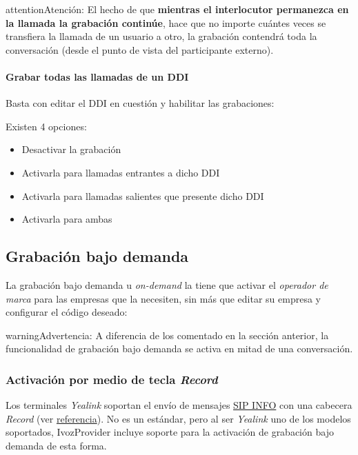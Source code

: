 \documentclass[letterpaper,10pt,spanish]{sphinxmanual}
\begin{document}
\begin{notice}{attention}{Atención:}
El hecho de que \textbf{mientras el interlocutor permanezca en la llamada la grabación continúe}, hace que no importe cuántes veces se transfiera la llamada de un usuario a otro, la grabación contendrá toda la conversación (desde el punto de vista del participante externo).
\end{notice}
\paragraph{Grabar todas las llamadas de un DDI}

Basta con editar el DDI en cuestión y habilitar las grabaciones:

\noindent{}

Existen 4 opciones:
\begin{itemize}
\item {} 
Desactivar la grabación

\item {} 
Activarla para llamadas entrantes a dicho DDI

\item {} 
Activarla para llamadas salientes que presente dicho DDI

\item {} 
Activarla para ambas

\end{itemize}


\subsection{Grabación bajo demanda}
\label{pbx_features/call_recording:grabacion-bajo-demanda}
La grabación bajo demanda u \emph{on-demand} la tiene que activar el \emph{operador de marca} para las empresas que la necesiten, sin más que editar su empresa y configurar el código deseado:

\noindent{}

\begin{notice}{warning}{Advertencia:}
A diferencia de los {\hyperref[pbx_features/services:services]{}} comentado en la sección anterior, la funcionalidad de grabación bajo demanda se activa en mitad de una conversación.
\end{notice}


\subsubsection{Activación por medio de tecla \emph{Record}}
\label{pbx_features/call_recording:activacion-por-medio-de-tecla-record}
Los terminales \emph{Yealink} soportan el envío de mensajes \href{https://tools.ietf.org/html/rfc6086}{SIP INFO} con una cabecera \emph{Record} (ver \href{http://www.yealink.com/Upload/document/UsingCallRecordingFeatureonYealinkPhones/UsingCallRecordingFeatureonYealinkSIPT2XPphonesRev\_610-20561729764.pdf}{referencia}). No es un estándar, pero al ser \emph{Yealink} uno de los modelos soportados, IvozProvider incluye soporte para la activación de grabación bajo demanda de esta forma.
\end{document}
